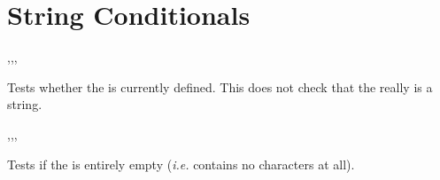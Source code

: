 \documentclass[oneside]{book}
\begin{document}
\section{String Conditionals}

\begin{function}{\strIfExist,\strIfExistT,\strIfExistF,\strIfExistTF}
\begin{syntax}
 
  
  
   
\end{syntax}
Tests whether the  is currently defined.  This does not
check that the  really is a string.
\begin{demohigh}
\strIfExistTF {} {}
\strIfExistTF {} {}
\end{demohigh}
\end{function}

\begin{function}{\strVarIfEmpty,\strVarIfEmptyT,\strVarIfEmptyF,\strVarIfEmptyTF}
\begin{syntax}
 
  
  
   
\end{syntax}
Tests if the  is entirely empty
(\emph{i.e.} contains no characters at all).
\begin{demohigh}
\strSet {}
\strVarIfEmptyTF {} {}
\strClear \lTmpaStr
\strVarIfEmptyTF {} {}
\end{demohigh}
\end{function}
\end{document}
